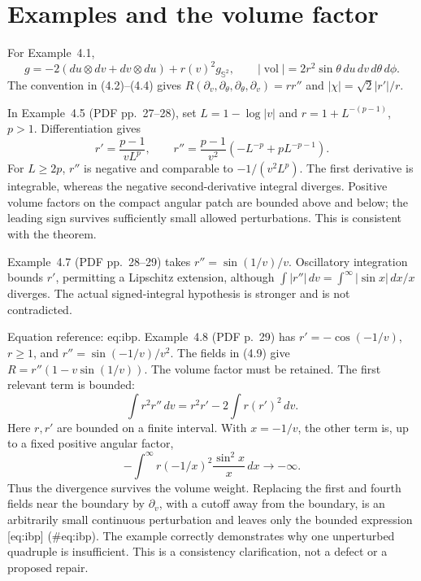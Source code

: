 \documentclass[10pt]{article}
\begin{document}
\section*{Examples and the volume factor}
For Example 4.1, \[g=-2(du\otimes dv+dv\otimes du)+r(v)^2g_{\mathbb S^2},\qquad
 |\operatorname{vol}|=2r^2\sin\theta\,du\,dv\,d\theta\,d\phi.\] The convention in (4.2)–(4.4) gives \(R(\partial_v,\partial_\theta,\partial_\theta,\partial_v)=rr''\) and \(|\chi|=\sqrt2|r'|/r\).\par
In Example 4.5 (PDF pp. 27–28), set \(L=1-\log|v|\) and \(r=1+L^{-(p-1)}\), \(p>1\). Differentiation gives \[r'=\frac{p-1}{vL^p},\qquad
 r''=\frac{p-1}{v^2}(-L^{-p}+pL^{-p-1}).\] For \(L\ge2p\), \(r''\) is negative and comparable to \(-1/(v^2L^p)\). The first derivative is integrable, whereas the negative second-derivative integral diverges. Positive volume factors on the compact angular patch are bounded above and below; the leading sign survives sufficiently small allowed perturbations. This is consistent with the theorem.\par
Example 4.7 (PDF pp. 28–29) takes \(r''=\sin(1/v)/v\). Oscillatory integration bounds \(r'\), permitting a Lipschitz extension, although \(\int |r''|\,dv=\int^\infty|\sin x|\,dx/x\) diverges. The actual signed-integral hypothesis is stronger and is not contradicted.\par
Equation reference: eq:ibp. Example 4.8 (PDF p. 29) has \(r'=-\cos(-1/v)\), \(r\ge1\), and \(r''=\sin(-1/v)/v^2\). The fields in (4.9) give \(R=r''(1-v\sin(1/v))\). The volume factor must be retained. The first relevant term is bounded: \[
 \int r^2r''\,dv=r^2r'-2\int r(r')^2\,dv .\] Here \(r,r'\) are bounded on a finite interval. With \(x=-1/v\), the other term is, up to a fixed positive angular factor, \[-\int^\infty r(-1/x)^2\frac{\sin^2x}{x}\,dx\longrightarrow-\infty .\] Thus the divergence survives the volume weight. Replacing the first and fourth fields near the boundary by \(\partial_v\), with a cutoff away from the boundary, is an arbitrarily small continuous perturbation and leaves only the bounded expression [eq:ibp] (\#eq:ibp). The example correctly demonstrates why one unperturbed quadruple is insufficient. This is a consistency clarification, not a defect or a proposed repair.\par
\end{document}
